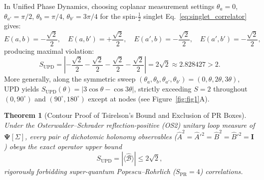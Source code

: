 \documentclass[11pt,a4paper]{article}
\newtheorem{theorem}{Theorem}
\begin{document}
In Unified Phase Dynamics, choosing coplanar measurement settings $\theta_a = 0$, $\theta_{a'} = \pi/2$, $\theta_b = \pi/4$, $\theta_{b'} = 3\pi/4$ for the spin-$\frac{1}{2}$ singlet Eq.~\eqref{eq:singlet_correlator} gives:
\begin{equation}
E(a,b) = -\frac{\sqrt{2}}{2}, \quad E(a,b') = +\frac{\sqrt{2}}{2}, \quad E(a',b) = -\frac{\sqrt{2}}{2}, \quad E(a',b') = -\frac{\sqrt{2}}{2},
\end{equation}
producing maximal violation:
\begin{equation}
S_{\mathrm{UPD}} = \left|-\frac{\sqrt{2}}{2} - \frac{\sqrt{2}}{2} - \frac{\sqrt{2}}{2} - \frac{\sqrt{2}}{2}\right| = 2\sqrt{2} \approx 2.828427 > 2.
\end{equation}
More generally, along the symmetric sweep $(\theta_a, \theta_b, \theta_{a'}, \theta_{b'}) = (0, \theta, 2\theta, 3\theta)$, UPD yields $S_{\mathrm{UPD}}(\theta) = |3\cos\theta - \cos 3\theta|$, strictly exceeding $S=2$ throughout $(0, 90^\circ)$ and $(90^\circ, 180^\circ)$ except at nodes (see Figure~\ref{fig:fig1}A).

\begin{theorem}[Contour Proof of Tsirelson's Bound and Exclusion of PR Boxes]
Under the Osterwalder--Schrader reflection-positive (OS2) unitary loop measure of $\mathbf{\Psi}[\Sigma]$, every pair of dichotomic holonomy observables ($\hat{A}^2 = \hat{A}'^2 = \hat{B}^2 = \hat{B}'^2 = \mathbf{I}$) obeys the exact operator upper bound
\begin{equation}
S_{\mathrm{UPD}} = |\langle \hat{\mathcal{B}} \rangle| \le 2\sqrt{2},
\end{equation}
rigorously forbidding super-quantum Popescu--Rohrlich ($S_{\mathrm{PR}} = 4$) correlations.
\end{theorem}
\end{document}
